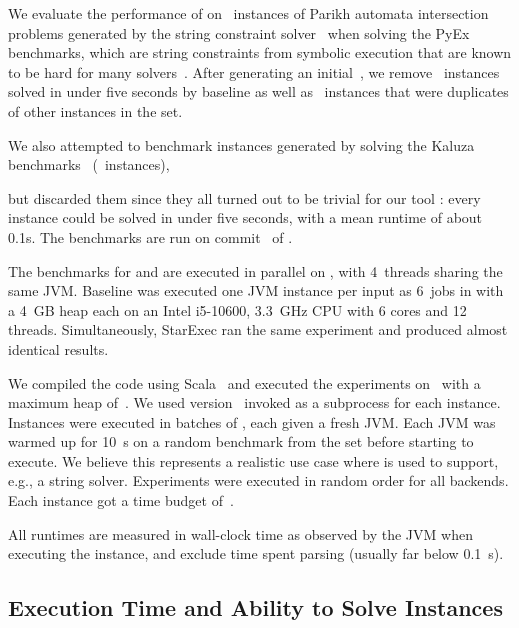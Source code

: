 
We evaluate the performance of \Catra{} on~\NrBenchmarks{} instances of Parikh
automata intersection problems generated by the \OstrichPlus{} string constraint
solver~\cite{ostrich-plus} when solving the PyEx benchmarks, 
which are string constraints from symbolic execution that are known
to be hard for many solvers~\cite{pyex}. After generating an
initial~\InitialNrBenchmarks{}, we remove~\NrTrivial{} instances solved in under
five seconds by baseline as well as~\NrInvalid{} instances that were duplicates of other instances in the set.

 We also attempted to benchmark instances generated by
\OstrichPlus{} solving the Kaluza benchmarks~\cite{Saxena10:kaluza}
(~instances),

but discarded them since they all turned out to be trivial for our tool
\Catra{}: every instance
could be solved in under five seconds, with a mean runtime of about 0.1s.
The benchmarks are run
on commit~\texttt{\commit} of \Catra{}.

The benchmarks for \Calculus{} and \Nuxmv{} are executed in parallel on \BenchmarkRig{}, with 4~threads
sharing the same JVM. Baseline was
executed one JVM instance per input as 6~jobs in with a \SI{4}{GB} heap each on an Intel i5-10600, \SI{3.3}{GHz} CPU
with 6 cores and 12 threads. Simultaneously, StarExec ran the same experiment and produced almost identical results.

We compiled
the code using Scala~\ScalaVersion{} and executed the experiments
on~\JvmVersion{} with a maximum heap of~\MaxHeapSize{}. We used \Nuxmv{}
version~\NuxmvVersion{} invoked as a subprocess for each instance. Instances
were executed in batches of \BatchSize{}, each given a fresh JVM. Each JVM was
warmed up for \SI{10}{s} on a random benchmark from the set before starting
to execute. We believe this represents a realistic use case where \Calculus{} is
used to support, e.g., a string solver. Experiments were executed in random order
for all backends. Each instance got a time budget of~\RuntimeTimeout{}.

All runtimes are measured in wall-clock time as observed by the JVM when
executing the instance, and exclude time spent parsing (usually far below
\SI{0.1}{s}).

\subsection{Execution Time and Ability to Solve Instances}\label{sec:runtime}


